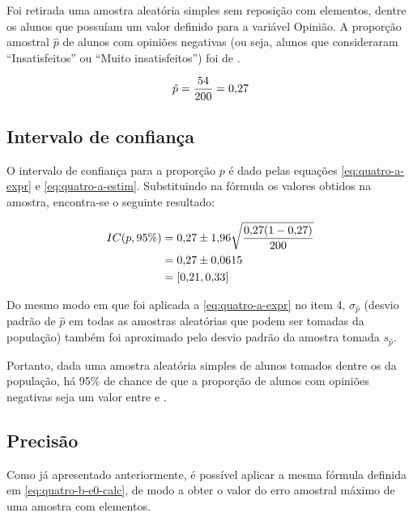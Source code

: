 

	Foi retirada uma amostra aleatória simples sem reposição com \CINCOn
	elementos, dentre os \CINCON alunos que possuíam um valor definido para
	a variável Opinião.  A proporção amostral $\hat{p}$ de alunos com
	opiniões negativas (ou seja, alunos que consideraram ``Insatisfeitos''
	ou ``Muito insatisfeitos'') foi de \CINCOpAmostral.

	\begin{align*} 
		\hat{p}  &= {\frac{54}{200}} = \num{0.27} \nonumber \\
	\end{align*}

\subsection{Intervalo de confiança}

	O intervalo de confiança para a proporção $p$ é dado pelas
	equações \eqref{eq:quatro-a-expr} e \eqref{eq:quatro-a-estim}.  
	Substituindo na fórmula os valores obtidos na amostra, encontra-se
	o seguinte resultado:

	\begin{align} 
		IC(p, 95\%) 
					&= \num{0.27} \pm \num{1.96} \sqrt{\frac{\num{0.27} (1- \num{0.27})}{200}} \nonumber \\
					&= \num{0.27} \pm \num{0.0615} \nonumber \\
					\label{eq:cinco-a-result}
					&= [\num{0.21}, \num{0.33}]
	\end{align}

	Do mesmo modo em que foi aplicada a \autoref{eq:quatro-a-expr} no item
	4, $\sigma_{\hat{p}}$ (desvio padrão de $\hat{p}$ em todas as amostras
	aleatórias que podem ser tomadas da população) também foi aproximado
	pelo desvio padrão da amostra tomada $s_{\hat{p}}$.

	Portanto, dada uma amostra aleatória simples de \CINCOn alunos tomados
	dentre os \CINCON da população, há 95\% de chance de que a proporção de
	alunos com opiniões negativas seja um valor entre \CINCOAICinf e
	\CINCOAICsup.

\subsection{Precisão}

	Como já apresentado anteriormente, é possível aplicar a mesma
	fórmula definida em \eqref{eq:quatro-b-e0-calc}, de modo a obter o valor
	do erro amostral máximo de uma amostra com \CINCOn elementos.

